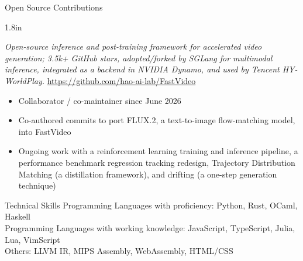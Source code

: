 \documentclass{cv}
\begin{document}
\begin{block}{Open Source Contributions}
  \begin{entries}{1.8in}
    {
    \textit{Open-source inference and post-training framework for
    accelerated video generation; 3.5k+ GitHub stars, adopted/forked by
    SGLang for multimodal inference, integrated as a backend in NVIDIA
    Dynamo, and used by Tencent HY-WorldPlay.}
    \url{https://github.com/hao-ai-lab/FastVideo}
    \begin{itemize}
      \item Collaborator / co-maintainer since June 2026
      \item Co-authored commits to port FLUX.2, a text-to-image
        flow-matching model, into FastVideo
      \item Ongoing work with a reinforcement learning training and
        inference pipeline, a performance benchmark regression tracking
        redesign, Trajectory Distribution Matching (a distillation
        framework), and drifting (a one-step generation technique)
    \end{itemize}
    }
  \end{entries}
  \vspace{12pt}
\end{block}

\begin{block}{Technical Skills}
  Programming Languages with proficiency: Python, Rust, OCaml, Haskell\\
  Programming Languages with working knowledge: JavaScript, TypeScript, Julia, Lua, VimScript\\
  Others: LLVM IR, MIPS Assembly, WebAssembly, HTML/CSS\\
\end{block}

\begin{refsection}
  \nocite{*}
  \printbibliography[title=Peer-Reviewed Publications]
\end{refsection}


\begin{refsection}[talks]
  \nocite{*}
  \printbibliography[title=Talks and Presentations]
\end{refsection}
\end{document}
